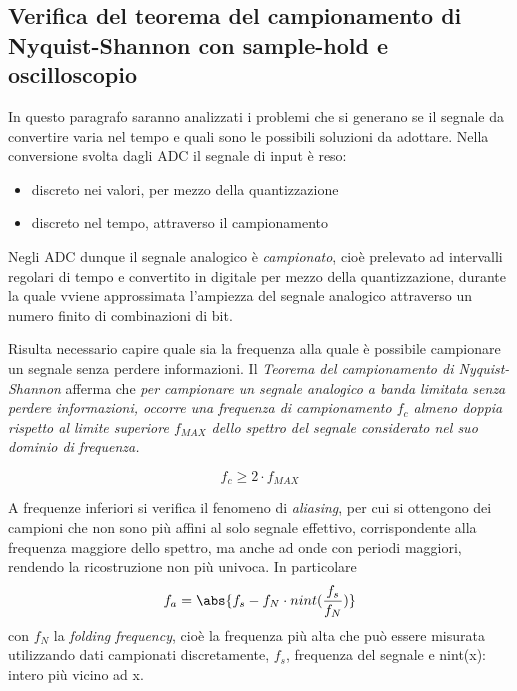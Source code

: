 \documentclass[journal]{IEEEtran}
\begin{document}


\subsection{Verifica del teorema del campionamento di Nyquist-Shannon con sample-hold e oscilloscopio}

In questo paragrafo saranno analizzati i problemi che si generano se il segnale da convertire varia nel tempo e quali sono le possibili soluzioni da adottare. Nella conversione svolta dagli ADC il segnale di input è reso:
\begin{itemize}
   \item discreto nei valori, per mezzo della quantizzazione
   \item discreto nel tempo, attraverso il campionamento
\end{itemize}
Negli ADC dunque il segnale analogico è \textit{campionato}, cioè prelevato ad intervalli regolari di tempo e convertito in digitale per mezzo della quantizzazione, durante la quale vviene approssimata l'ampiezza del segnale analogico attraverso un numero finito di combinazioni di bit.

Risulta necessario capire quale sia la frequenza alla quale è possibile campionare un segnale senza perdere informazioni. Il \textit{Teorema del campionamento di Nyquist-Shannon} afferma che \textit{per campionare un segnale analogico a banda limitata senza perdere informazioni, occorre una frequenza di campionamento $f_c$ almeno doppia rispetto al limite superiore $f_{MAX}$ dello spettro del segnale considerato nel suo dominio di frequenza.}

\begin{equation}
    f_c \ge 2 \cdot f_{MAX}
\end{equation}

A frequenze inferiori si verifica il fenomeno di \textit{aliasing}, per cui si ottengono dei campioni che non sono più affini al solo segnale effettivo, corrispondente alla frequenza maggiore dello spettro, ma anche ad onde con periodi maggiori, rendendo la ricostruzione non più univoca.
In particolare
\begin{equation}
    f_a = \abs{f_s - f_N \cdot nint(\frac{f_s}{f_N})}
\end{equation}
con $f_N$ la \textit{folding frequency}, cioè la frequenza più alta che può essere misurata utilizzando dati campionati discretamente, $f_s$, frequenza del segnale e nint(x): intero più vicino ad x.
\end{document}
